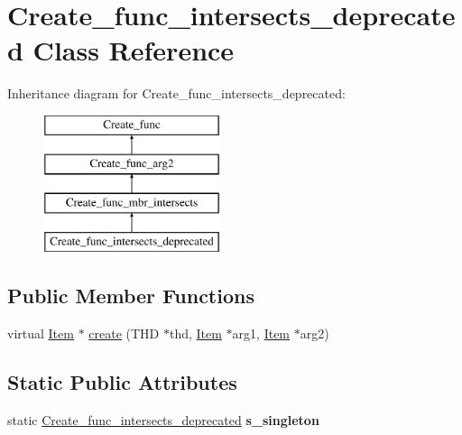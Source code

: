 \hypertarget{classCreate__func__intersects__deprecated}{}\section{Create\+\_\+func\+\_\+intersects\+\_\+deprecated Class Reference}
\label{classCreate__func__intersects__deprecated}
Inheritance diagram for Create\+\_\+func\+\_\+intersects\+\_\+deprecated\+:\begin{figure}[H]
\begin{center}
\leavevmode
\includegraphics[height=4.000000cm]{classCreate__func__intersects__deprecated}
\end{center}
\end{figure}
\subsection*{Public Member Functions}
\begin{DoxyCompactItemize}
\item 
virtual \mbox{\hyperlink{classItem}{Item}} $\ast$ \mbox{\hyperlink{classCreate__func__intersects__deprecated_ab8944b592f825ce62fc97b78eaf11511}{create}} (T\+HD $\ast$thd, \mbox{\hyperlink{classItem}{Item}} $\ast$arg1, \mbox{\hyperlink{classItem}{Item}} $\ast$arg2)
\end{DoxyCompactItemize}
\subsection*{Static Public Attributes}
\begin{DoxyCompactItemize}
\item 
\mbox{\label{classCreate__func__intersects__deprecated_a2466c0778431c2c691b8c8d55cdda278}} 
static \mbox{\hyperlink{classCreate__func__intersects__deprecated}{Create\+\_\+func\+\_\+intersects\+\_\+deprecated}} {\bfseries s\+\_\+singleton}
\end{DoxyCompactItemize}
